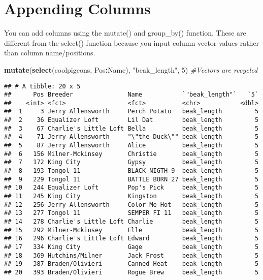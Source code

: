 \documentclass[]{article}
\newenvironment{Shaded}{\begin{snugshade}}{\end{snugshade}}
\newcommand{\KeywordTok}[1]{\textcolor[rgb]{0.13,0.29,0.53}{\textbf{#1}}}
\newcommand{\DecValTok}[1]{\textcolor[rgb]{0.00,0.00,0.81}{#1}}
\newcommand{\StringTok}[1]{\textcolor[rgb]{0.31,0.60,0.02}{#1}}
\newcommand{\CommentTok}[1]{\textcolor[rgb]{0.56,0.35,0.01}{\textit{#1}}}
\newcommand{\OperatorTok}[1]{\textcolor[rgb]{0.81,0.36,0.00}{\textbf{#1}}}
\newcommand{\NormalTok}[1]{#1}
\begin{document}
\section{Appending Columns}\label{appending-columns}

You can add columns using the mutate() and group\_by() function. These
are different from the select() function because you input column vector
values rather than column name/positions.

\begin{Shaded}
\begin{Highlighting}[]
\KeywordTok{mutate}\NormalTok{(}\KeywordTok{select}\NormalTok{(coolpigeons, Pos}\OperatorTok{:}\NormalTok{Name), }\StringTok{"beak_length"}\NormalTok{, }\DecValTok{5}\NormalTok{) }\CommentTok{#Vectors are recycled }
\end{Highlighting}
\end{Shaded}

\begin{verbatim}
## # A tibble: 20 x 5
##      Pos Breeder               Name           `"beak_length"`   `5`
##    <int> <fct>                 <fct>          <chr>           <dbl>
##  1     3 Jerry Allensworth     Perch Potato   beak_length         5
##  2    36 Equalizer Loft        Lil Dat        beak_length         5
##  3    67 Charlie's Little Loft Bella          beak_length         5
##  4    71 Jerry Allensworth     "\"the Duck\"" beak_length         5
##  5    87 Jerry Allensworth     Alice          beak_length         5
##  6   156 Milner-Mckinsey       Christie       beak_length         5
##  7   172 King City             Gypsy          beak_length         5
##  8   193 Tongol 11             BLACK NIGTH 9  beak_length         5
##  9   229 Tongol 11             BATTLE BORN 27 beak_length         5
## 10   244 Equalizer Loft        Pop's Pick     beak_length         5
## 11   245 King City             Kingston       beak_length         5
## 12   256 Jerry Allensworth     Color Me Hot   beak_length         5
## 13   277 Tongol 11             SEMPER FI 11   beak_length         5
## 14   278 Charlie's Little Loft Charlie        beak_length         5
## 15   292 Milner-Mckinsey       Elle           beak_length         5
## 16   296 Charlie's Little Loft Edward         beak_length         5
## 17   334 King City             Gage           beak_length         5
## 18   369 Hutchins/Milner       Jack Frost     beak_length         5
## 19   387 Braden/Olivieri       Canned Heat    beak_length         5
## 20   393 Braden/Olivieri       Rogue Brew     beak_length         5
\end{verbatim}
\end{document}
